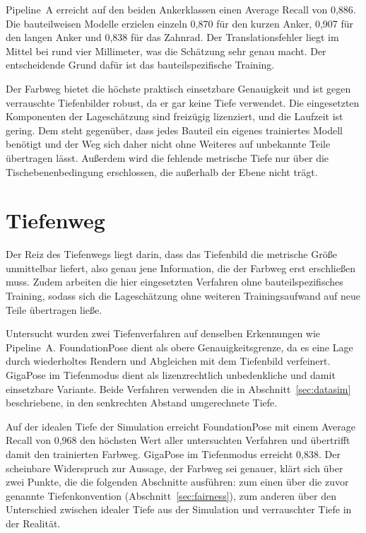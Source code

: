 \documentclass[oneside,studentpaper]{wbk}
\begin{document}
Pipeline~A erreicht auf den beiden Ankerklassen einen Average Recall von 0,886.
Die bauteilweisen Modelle erzielen einzeln 0,870 für den kurzen Anker, 0,907 für
den langen Anker und 0,838 für das Zahnrad. Der Translationsfehler liegt im Mittel
bei rund vier Millimeter, was die Schätzung sehr genau macht. Der entscheidende
Grund dafür ist das bauteilspezifische Training.

Der Farbweg bietet die höchste praktisch einsetzbare Genauigkeit und ist gegen
verrauschte Tiefenbilder robust, da er gar keine Tiefe verwendet. Die eingesetzten
Komponenten der Lageschätzung sind freizügig lizenziert, und die Laufzeit ist
gering. Dem steht gegenüber, dass jedes Bauteil ein eigenes trainiertes Modell
benötigt und der Weg sich daher nicht ohne Weiteres auf unbekannte Teile
übertragen lässt. Außerdem wird die fehlende metrische Tiefe nur über die
Tischebenenbedingung erschlossen, die außerhalb der Ebene nicht trägt.

\section{Tiefenweg}
\label{sec:rgbd}

Der Reiz des Tiefenwegs liegt darin, dass das Tiefenbild die metrische Größe
unmittelbar liefert, also genau jene Information, die der Farbweg erst erschließen
muss. Zudem arbeiten die hier eingesetzten Verfahren ohne bauteilspezifisches
Training, sodass sich die Lageschätzung ohne weiteren Trainingsaufwand auf neue
Teile übertragen ließe.

Untersucht wurden zwei Tiefenverfahren auf denselben Erkennungen wie Pipeline~A.
FoundationPose dient als obere Genauigkeitsgrenze, da es eine Lage durch
wiederholtes Rendern und Abgleichen mit dem Tiefenbild verfeinert. GigaPose im
Tiefenmodus dient als lizenzrechtlich unbedenkliche und damit einsetzbare
Variante. Beide Verfahren verwenden die in Abschnitt~\ref{sec:datasim}
beschriebene, in den senkrechten Abstand umgerechnete Tiefe.

Auf der idealen Tiefe der Simulation erreicht FoundationPose mit einem Average
Recall von 0,968 den höchsten Wert aller untersuchten Verfahren und übertrifft
damit den trainierten Farbweg. GigaPose im Tiefenmodus erreicht 0,838. Der
scheinbare Widerspruch zur Aussage, der Farbweg sei genauer, klärt sich über zwei
Punkte, die die folgenden Abschnitte ausführen: zum einen über die zuvor genannte
Tiefenkonvention (Abschnitt~\ref{sec:fairness}), zum anderen über den Unterschied
zwischen idealer Tiefe aus der Simulation und verrauschter Tiefe in der Realität.
\end{document}
